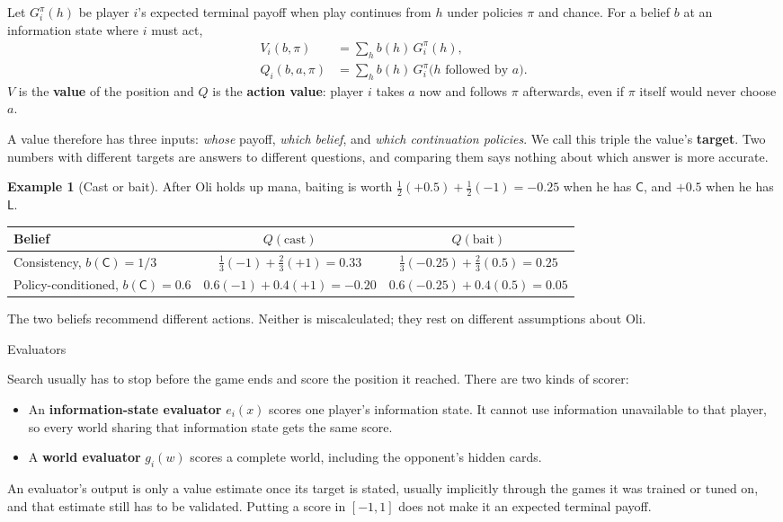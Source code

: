 \documentclass[11pt,a4paper]{article}
\makeatletter
\renewcommand\subsection{\@startsection{subsection}{2}{\z@}
  {-2.6ex \@plus -1ex \@minus -.2ex}{1.2ex \@plus .2ex}
  {\normalfont\large\sffamily\bfseries\color{ink}}}
\theoremstyle{plain}
\theoremstyle{definition}
\newtheorem{example}{Example}
\newcommand{\term}[1]{\textbf{#1}}
\newcommand{\Cs}{\mathsf C}
\newcommand{\Ld}{\mathsf L}
\makeatother
\begin{document}
Let $G_i^{\pi}(h)$ be player $i$'s expected terminal payoff when play
continues from $h$ under policies $\pi$ and chance. For a belief $b$ at an
information state where $i$ must act,
\begin{align}
V_i(b,\pi)&=\sum_{h}b(h)\,G_i^{\pi}(h), \label{eq:V}\\
Q_i(b,a,\pi)&=\sum_{h}b(h)\,G_i^{\pi}\bigl(h\text{ followed by }a\bigr). \label{eq:Q}
\end{align}
$V$ is the \term{value} of the position and $Q$ is the \term{action value}:
player $i$ takes $a$ now and follows $\pi$ afterwards, even if $\pi$ itself
would never choose $a$.

A value therefore has three inputs: \emph{whose} payoff, \emph{which belief},
and \emph{which continuation policies}. We call this triple the value's
\term{target}. Two numbers with different targets are answers to different
questions, and comparing them says nothing about which answer is more
accurate.

\begin{example}[Cast or bait]
\label{ex:values}
After Oli holds up mana, baiting is worth $\tfrac12(+0.5)+\tfrac12(-1)=-0.25$
when he has $\Cs$, and $+0.5$ when he has $\Ld$.

\begin{center}
\begin{tabular}{@{}lcc@{}}
\toprule
Belief & $Q(\text{cast})$ & $Q(\text{bait})$\\
\midrule
Consistency, $b(\Cs)=1/3$ & $\tfrac13(-1)+\tfrac23(+1)=0.33$ & $\tfrac13(-0.25)+\tfrac23(0.5)=0.25$\\
Policy-conditioned, $b(\Cs)=0.6$ & $0.6(-1)+0.4(+1)=-0.20$ & $0.6(-0.25)+0.4(0.5)=0.05$\\
\bottomrule
\end{tabular}
\end{center}

The two beliefs recommend different actions. Neither is miscalculated;
they rest on different assumptions about Oli.
\end{example}

\subsection{Evaluators}

Search usually has to stop before the game ends and score the position it
reached. There are two kinds of scorer:
\begin{itemize}
\item An \term{information-state evaluator} $e_i(x)$ scores one player's
  information state. It cannot use information unavailable to that player,
  so every world sharing that information state gets the same score.
\item A \term{world evaluator} $g_i(w)$ scores a complete world, including
  the opponent's hidden cards.
\end{itemize}
An evaluator's output is only a value estimate once its target is stated,
usually implicitly through the games it was trained or tuned on, and that
estimate still has to be validated. Putting a score in $[-1,1]$ does not make
it an expected terminal payoff.
\end{document}
